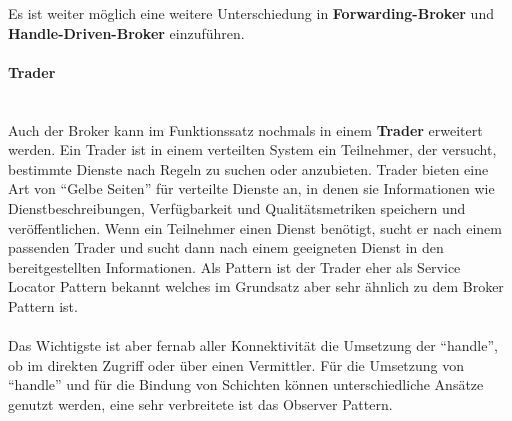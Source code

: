 \documentclass[../vs-script-first-v01.tex]{subfiles}
\begin{document}
Es ist weiter möglich eine weitere Unterschiedung in \textbf{Forwarding-Broker} und \textbf{Handle-Driven-Broker} einzuführen. 
\paragraph{Trader}\mbox{}\\
Auch der Broker kann im Funktionssatz nochmals in einem \textbf{Trader} erweitert werden. Ein Trader ist in einem verteilten System ein Teilnehmer, der versucht, bestimmte Dienste nach Regeln zu suchen oder anzubieten. Trader bieten eine Art von \enquote{Gelbe Seiten} für verteilte Dienste an, in denen sie Informationen wie Dienstbeschreibungen, Verfügbarkeit und Qualitätsmetriken speichern und veröffentlichen. Wenn ein Teilnehmer einen Dienst benötigt, sucht er nach einem passenden Trader und sucht dann nach einem geeigneten Dienst in den bereitgestellten Informationen. Als Pattern ist der Trader eher als Service Locator Pattern bekannt welches im Grundsatz aber sehr ähnlich zu dem Broker Pattern ist. 
\\\\
Das Wichtigste ist aber fernab aller Konnektivität die Umsetzung der \enquote{handle}, ob im direkten Zugriff oder über einen Vermittler. Für die Umsetzung von \enquote{handle} und für die Bindung von Schichten können unterschiedliche Ansätze genutzt werden, eine sehr verbreitete ist das Observer Pattern. 
\end{document}
